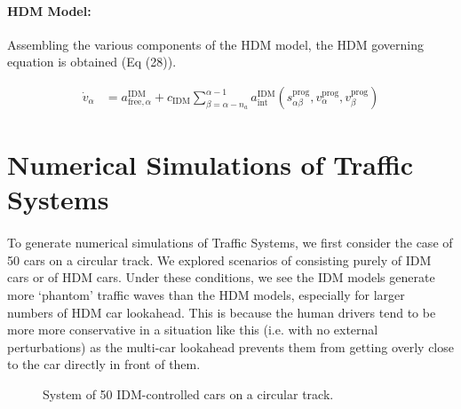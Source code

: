 \documentclass[12pt]{article}
\begin{document}
\paragraph{HDM Model:}
Assembling the various components of the HDM model, the HDM governing equation is obtained (Eq (28)).
\begin{mymathbox}[ams gather, title=HDM Governing Equation,colframe=blue!30!black]
  \begin{align}
\dot v_\alpha &= a_{\text{free},\alpha}^{\text{IDM}}+c_{\text{IDM}}\sum_{\beta=\alpha-n_a}^{\alpha-1}a_{\text{int}}^{\text{IDM}}(s^{\text{prog}}_{\alpha\beta},v^{\text{prog}}_\alpha,v^{\text{prog}}_\beta)
  \end{align}
\end{mymathbox}
\section{Numerical Simulations of Traffic Systems}

\paragraph{}To generate numerical simulations of Traffic Systems, we first consider the case of 50 cars on a circular track. We explored scenarios of consisting purely of IDM cars or of HDM cars. Under these conditions, we see the IDM models generate more `phantom' traffic waves than the HDM models, especially for larger numbers of HDM car lookahead. This is because the human drivers tend to be more more conservative in a situation like this (i.e. with no external perturbations) as the multi-car lookahead prevents them from getting overly close to the car directly in front of them.

\begin{figure}[H]
  \centering
  \caption{System of 50 IDM-controlled cars on a circular track.}
\end{figure}
\end{document}
